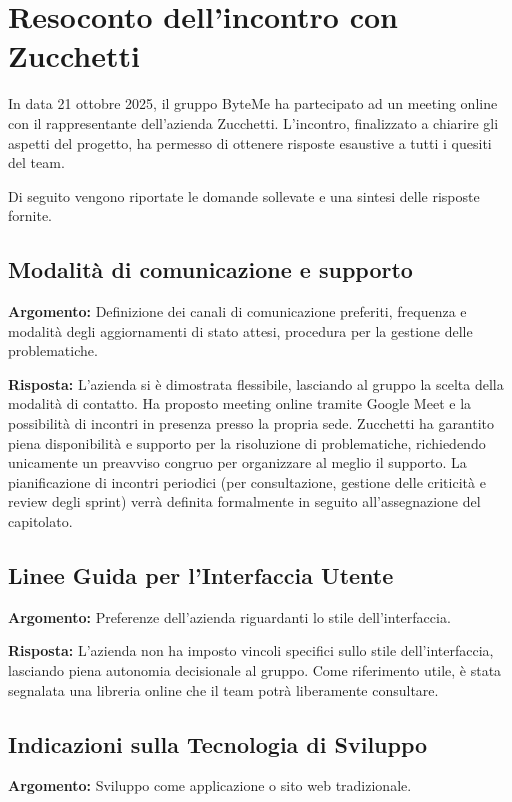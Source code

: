\documentclass[11pt,a4paper]{article}
\begin{document}
\newpage
\section{Resoconto dell'incontro con Zucchetti}
In data 21 ottobre 2025, il gruppo ByteMe ha partecipato ad un meeting online con il rappresentante dell'azienda Zucchetti. L'incontro, finalizzato a chiarire gli aspetti del progetto, ha permesso di ottenere risposte esaustive a tutti i quesiti del team.

Di seguito vengono riportate le domande sollevate e una sintesi delle risposte fornite.

\subsection{Modalità di comunicazione e supporto}
\textbf{Argomento:} Definizione dei canali di comunicazione preferiti, frequenza e modalità degli aggiornamenti di stato attesi, procedura per la gestione delle problematiche.

\textbf{Risposta:} L'azienda si è dimostrata flessibile, lasciando al gruppo la scelta della modalità di contatto. Ha proposto meeting online tramite Google Meet e la possibilità di incontri in presenza presso la propria sede. Zucchetti ha garantito piena disponibilità e supporto per la risoluzione di problematiche, richiedendo unicamente un preavviso congruo per organizzare al meglio il supporto. La pianificazione di incontri periodici (per consultazione, gestione delle criticità e review degli sprint) verrà definita formalmente in seguito all'assegnazione del capitolato.

\subsection{Linee Guida per l'Interfaccia Utente}
\textbf{Argomento:} Preferenze dell'azienda riguardanti lo stile dell'interfaccia.

\textbf{Risposta:} L'azienda non ha imposto vincoli specifici sullo stile dell'interfaccia, lasciando piena autonomia decisionale al gruppo. Come riferimento utile, è stata segnalata una libreria online che il team potrà liberamente consultare.

\subsection{Indicazioni sulla Tecnologia di Sviluppo}
\textbf{Argomento:} Sviluppo come applicazione o sito web tradizionale.
\end{document}
